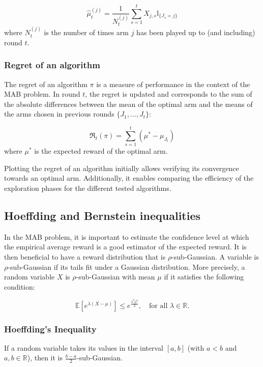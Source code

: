 \documentclass{statsmsc}
\begin{document}
\begin{equation}
\hat{\mu}_t^{(j)} = \frac{1}{N_t^{(j)}}\sum_{s=1}^{t} X_{j,s} \mathbb{I}_{\{J_s = j\}}
\label{eq:empirical_exp_rew}
\end{equation}
where $N_t^{(j)}$ is the number of times arm $j$ has been played up to (and including) round $t$.

\subsubsection{Regret of an algorithm}

The regret of an algorithm $\pi$ is a measure of performance in the context of the MAB problem. In round $t$, the regret is updated and corresponds to the sum of the absolute differences between the mean of the optimal arm and the means of the arms chosen in previous rounds $\{J_1, \dots, J_t\}$:

\begin{equation}
    \mathfrak{R}_t(\pi) = \sum_{s=1}^{t}(\mu^* - \mu_{J_t}) 
    \label{eq:regret}
\end{equation}
where $\mu^*$ is the expected reward of the optimal arm. 

Plotting the regret of an algorithm initially allows verifying its convergence towards an optimal arm. Additionally, it enables comparing the efficiency of the exploration phases for the different tested algorithms.

\subsection{Hoeffding and Bernstein inequalities}

In the MAB problem, it is important to estimate the confidence level at which the empirical average reward is a good estimator of the expected reward. It is then beneficial to have a reward distribution that is $\rho$-sub-Gaussian. A variable is $\rho$-sub-Gaussian if its tails fit under a Gaussian distribution.
More precisely, a random variable $X$ is $\rho$-sub-Gaussian with mean $\mu$ if it satisfies the following condition:

\[
\mathbb{E}[e^{\lambda (X - \mu)}] \leq e^{\frac{\lambda^2 \rho^2}{2}}, \quad \text{for all } \lambda \in \mathbb{R}.
\]
\subsubsection{Hoeffding's Inequality}
\begin{lemma}
  If a random variable takes its values in the interval $[a, b]$ (with $a < b$ and $a,b \in \mathbb{R}$), then it is $\frac{b-a}{2}$-sub-Gaussian.
\end{lemma}
\end{document}
